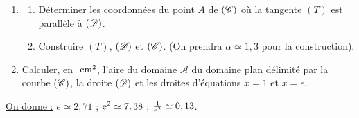 \begin{enumerate}
\begin{enumerate}
                        \item D\'emontrer que $\displaystyle{f(\alpha) = \frac{-2\alpha^2 + 3 \alpha + 1}{\alpha} }$.
                        \item Dresser le tableau de variation de la fonction $f$ sur $]0 ; +\infty[$.
                  \end{enumerate}
            \item \begin{enumerate}
                        \item D\'eterminer les coordonn\'ees du point $A$ de $(\mathscr{C})$ o\`u la tangente $(T)$ est
                              parall\`ele \`a $(\mathscr{D})$.
                        \item Construire $(T)$, $(\mathscr{D})$ et $(\mathscr{C})$.
                              (On prendra $\alpha \simeq 1,3$ pour la construction).
                  \end{enumerate}
            \item Calculer, en $~\mathrm{cm}^2$, l'aire du domaine $\mathcal{A}$ du domaine plan d\'elimit\'e par la courbe $(\mathscr{C})$,
                  la droite $(\mathscr{D})$ et les droites d'\'equations $x = 1$ et $x = e$.
      \end{enumerate}
      \begin{center}
            \underline{On donne :} $e \simeq 2,71$ ; $\mathrm{e}^{2} \simeq 7,38$ ; $\frac{1}{\mathrm{e}^{2}} \simeq 0,13$.
      \end{center}











